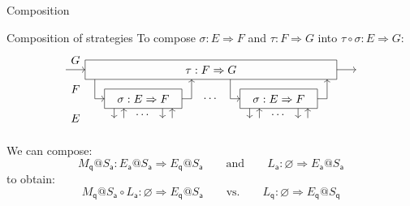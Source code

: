 \documentclass[aspectratio=141]{beamer}
\newcommand{\kw}[1]{\ensuremath{ \mathsf{#1} }}
\begin{document}
\begin{frame}{Composition} %
  \begin{block}{Composition of strategies}
    To compose $\sigma : E \Rightarrow F$ and
    $\tau : F \Rightarrow G$ into
    $\tau \circ \sigma : E \Rightarrow G$:
    \[
    \begin{tikzpicture}[scale=0.3]
      \draw[->] (-15, 3) -- (-13, 3);
      \draw[->] (13, 3) -- (15, 3);
      \draw (-13, 2) rectangle (13, 4);
      \node at (0, 3) {$\tau : F \Rightarrow G$};
      \begin{scope}[xshift=-7cm]
        \draw (-4,-1) rectangle (4,1);
        \draw[->] (-5, 2) |- (-4,0);
        \draw[->] (4,0) -| (5,2);
        \node (f) at (0,0) {$\sigma : E \Rightarrow F$};
        \draw[->] (-3, -1) -- (-3, -2);
        \draw[->] (-2, -2) -- (-2, -1);
        \node[below] at (0, -1) {$\cdots$};
        \draw[->] (2, -1) -- (2, -2);
        \draw[->] (3, -2) -- (3, -1);
      \end{scope}
      \node at (0, 0) {$\cdots$};
      \begin{scope}[xshift=7cm]
        \draw (-4,-1) rectangle (4,1);
        \draw[->] (-5, 2) |- (-4,0);
        \draw[->] (4,0) -| (5,2);
        \node (f) at (0,0) {$\sigma : E \Rightarrow F$};
        \draw[->] (-3, -1) -- (-3, -2);
        \draw[->] (-2, -2) -- (-2, -1);
        \node[below] at (0, -1) {$\cdots$};
        \draw[->] (2, -1) -- (2, -2);
        \draw[->] (3, -2) -- (3, -1);
      \end{scope}
      \node at (-14,  4) {$G$};
      \node at (-14,  1) {$F$};
      \node at (-14, -2) {$E$};
    \end{tikzpicture}
    \]
  \end{block}
  \pause
  \begin{example}
    We can compose:
    \[
      M_\kw{q}@S_\kw{a} :
        E_\kw{a}@S_\kw{a} \Rightarrow E_\kw{q}@S_\kw{a}
      \qquad \text{and} \qquad
      L_\kw{a} : \varnothing \Rightarrow E_\kw{a}@S_\kw{a}
    \]
    to obtain:
    \[
      M_\kw{q}@S_\kw{a} \circ L_\kw{a} :
        \varnothing \Rightarrow E_\kw{q}@S_\kw{a}
      \qquad \text{vs.} \qquad
      L_\kw{q} : \varnothing \Rightarrow E_\kw{q}@S_\kw{q}
    \]
  \end{example}
\end{frame}
\end{document}
